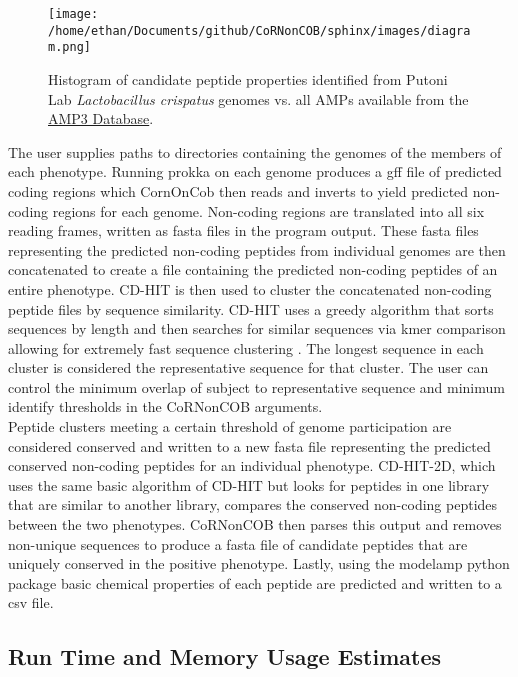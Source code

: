 \documentclass{article}
\begin{document}
\begin{figure}[h]
\centering
\texttt{[image: /home/ethan/Documents/github/CoRNonCOB/sphinx/images/diagram.png]}
\caption{Histogram of candidate peptide properties identified from Putoni Lab \emph{Lactobacillus crispatus} genomes vs. all AMPs available from the \href{http://aps.unmc.edu/AP/main.php}{AMP3 Database}.}
\label{fig:flow}
\end{figure}
The user supplies paths to directories containing the genomes of the members of each phenotype. Running prokka on each genome produces a gff file of predicted coding regions which CornOnCob then reads and inverts to yield predicted non-coding regions for each genome. Non-coding regions are translated into all six reading frames, written as fasta files in the program output. These fasta files representing the predicted non-coding peptides from individual genomes are then concatenated to create a file containing the predicted non-coding peptides of an entire phenotype. CD-HIT is then used to cluster the concatenated non-coding peptide files by sequence similarity. CD-HIT uses a greedy algorithm that sorts sequences by length and then searches for similar sequences via kmer comparison allowing for extremely fast sequence clustering \cite{10.1093/bioinformatics/btl158}. The longest sequence in each cluster is considered the representative sequence for that cluster. The user can control the minimum overlap of subject to representative sequence and minimum identify thresholds in the CoRNonCOB arguments. 
\\

Peptide clusters meeting a certain threshold of genome participation are considered conserved and written to a new fasta file representing the predicted conserved non-coding peptides for an individual phenotype. CD-HIT-2D, which uses the same basic algorithm of CD-HIT but looks for peptides in one library that are similar to another library, compares the conserved non-coding peptides between the two phenotypes. CoRNonCOB then parses this output and removes non-unique sequences to produce a fasta file of candidate peptides that are uniquely conserved in the positive phenotype. Lastly, using the modelamp python package basic chemical properties of each peptide are predicted and written to a csv file.

\subsection{Run Time and Memory Usage Estimates}
\end{document}

